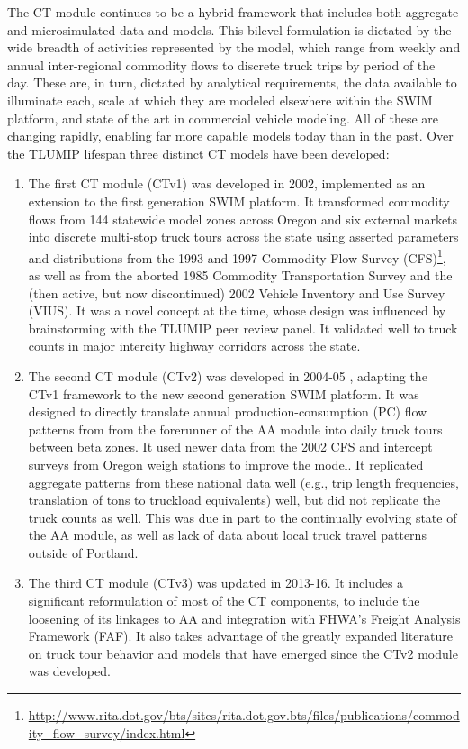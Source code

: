 The CT module continues to be a hybrid framework that includes both aggregate and microsimulated data and models. This bilevel formulation is dictated by the wide breadth of activities represented by the model, which range from weekly and annual inter-regional commodity flows to discrete truck trips by period of the day. These are, in turn, dictated by analytical requirements, the data available to illuminate each, scale at which they are modeled elsewhere within the SWIM platform, and state of the art in commercial vehicle modeling. All of these are changing rapidly, enabling far more capable models today than in the past. Over the TLUMIP lifespan three distinct CT models have been developed:
\begin{enumerate}
\item The first CT module (CTv1) was developed in 2002, implemented as an extension to the first generation SWIM platform. It transformed commodity flows from 144 statewide model zones across Oregon and six external markets into discrete multi-stop truck tours across the state using asserted parameters and distributions from the 1993 and 1997 Commodity Flow Survey (CFS)\footnote{\url{http://www.rita.dot.gov/bts/sites/rita.dot.gov.bts/files/publications/commodity_flow_survey/index.html}}, as well as from the aborted 1985 Commodity Transportation Survey and the (then active, but now discontinued) 2002 Vehicle Inventory and Use Survey (VIUS). It was a novel concept at the time, whose design was influenced by brainstorming with the TLUMIP peer review panel. It validated well to truck counts in major intercity highway corridors across the state. 
\item The second CT module (CTv2) was developed in 2004-05 \citep{donnelly07}, adapting the CTv1 framework to the new second generation SWIM platform. It was designed to directly translate annual production-consumption (PC) flow patterns from from the forerunner of the AA module into daily truck tours between beta zones. It used newer data from the 2002 CFS and intercept surveys from Oregon weigh stations to improve the model. It replicated aggregate patterns from these national data well (e.g., trip length frequencies, translation of tons to truckload equivalents) well, but did not replicate the truck counts as well. This was due in part to the continually evolving state of the AA module, as well as lack of data about local truck travel patterns outside of Portland.
\item The third CT module (CTv3) was updated in 2013-16. It includes a significant reformulation of most of the CT components, to include the loosening of its linkages to AA and integration with FHWA's Freight Analysis Framework (FAF). It also takes advantage of the greatly expanded literature on truck tour behavior and models that have emerged since the CTv2 module was developed.
\end{enumerate}

